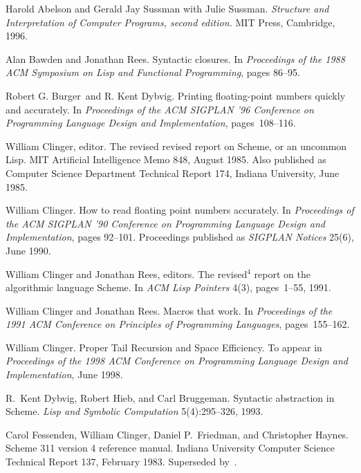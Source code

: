 \begin{thebibliography}{999}

Harold Abelson and Gerald Jay Sussman with Julie Sussman.
{\em Structure and Interpretation of Computer Programs, second edition.}
MIT Press, Cambridge, 1996.

Alan Bawden and Jonathan Rees.
Syntactic closures.
In {\em Proceedings of the 1988 ACM Symposium on Lisp and
  Functional Programming}, pages 86--95.

Robert G. Burger~and R. Kent Dybvig.
Printing floating-point numbers quickly and accurately.
In {\em Proceedings of the ACM SIGPLAN '96 Conference
  on Programming Language Design and Implementation}, pages~108--116.

William Clinger, editor.
The revised revised report on Scheme, or an uncommon Lisp.
MIT Artificial Intelligence Memo 848, August 1985.
Also published as Computer Science Department Technical Report 174,
  Indiana University, June 1985.

William Clinger.
How to read floating point numbers accurately.
In {\em Proceedings of the ACM SIGPLAN '90 Conference
  on Programming Language Design and Implementation}, pages 92--101.
Proceedings published as {\em SIGPLAN Notices} 25(6), June 1990.

William Clinger and Jonathan Rees, editors.
The revised$^4$ report on the algorithmic language Scheme.
In {\em ACM Lisp Pointers} 4(3), pages~1--55, 1991.

William Clinger and Jonathan Rees.
Macros that work.
In {\em Proceedings of the 1991 ACM Conference on Principles of
  Programming Languages}, pages~155--162.

William Clinger.
Proper Tail Recursion and Space Efficiency.
To appear in {\em Proceedings of the 1998 ACM Conference on Programming
 Language Design and Implementation}, June 1998.

R.~Kent Dybvig, Robert Hieb, and Carl Bruggeman.
Syntactic abstraction in Scheme.
{\em Lisp and Symbolic Computation} 5(4):295--326, 1993.

Carol Fessenden, William Clinger, Daniel P.~Friedman, and Christopher Haynes.
Scheme 311 version 4 reference manual.
Indiana University Computer Science Technical Report 137, February 1983.
Superseded by~\cite{Scheme84}.


\end{thebibliography}
